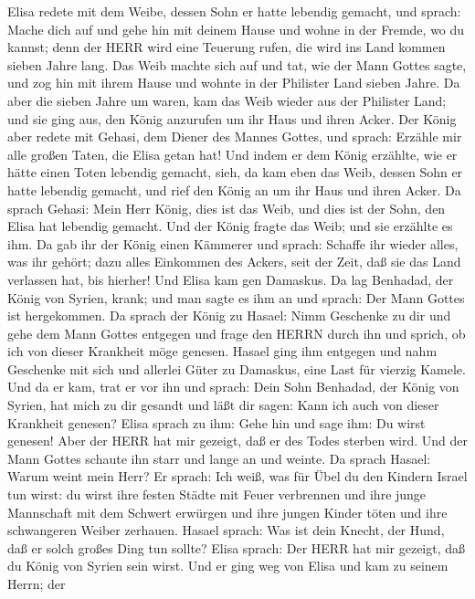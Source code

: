  Elisa redete mit dem Weibe, dessen Sohn er hatte lebendig
gemacht, und sprach: Mache dich auf und gehe hin mit deinem Hause und
wohne in der Fremde, wo du kannst; denn der HERR wird eine Teuerung
rufen, die wird ins Land kommen sieben Jahre lang.  Das Weib
machte sich auf und tat, wie der Mann Gottes sagte, und zog hin mit
ihrem Hause und wohnte in der Philister Land sieben Jahre. 
Da aber die sieben Jahre um waren, kam das Weib wieder aus der Philister
Land; und sie ging aus, den König anzurufen um ihr Haus und ihren Acker.
 Der König aber redete mit Gehasi, dem Diener des Mannes
Gottes, und sprach: Erzähle mir alle großen Taten, die Elisa getan hat!
 Und indem er dem König erzählte, wie er hätte einen Toten
lebendig gemacht, sieh, da kam eben das Weib, dessen Sohn er hatte
lebendig gemacht, und rief den König an um ihr Haus und ihren Acker. Da
sprach Gehasi: Mein Herr König, dies ist das Weib, und dies ist der
Sohn, den Elisa hat lebendig gemacht.  Und der König fragte
das Weib; und sie erzählte es ihm. Da gab ihr der König einen Kämmerer
und sprach: Schaffe ihr wieder alles, was ihr gehört; dazu alles
Einkommen des Ackers, seit der Zeit, daß sie das Land verlassen hat, bis
hierher!  Und Elisa kam gen Damaskus. Da lag Benhadad, der
König von Syrien, krank; und man sagte es ihm an und sprach: Der Mann
Gottes ist hergekommen.  Da sprach der König zu Hasael: Nimm
Geschenke zu dir und gehe dem Mann Gottes entgegen und frage den HERRN
durch ihn und sprich, ob ich von dieser Krankheit möge genesen.
 Hasael ging ihm entgegen und nahm Geschenke mit sich und
allerlei Güter zu Damaskus, eine Last für vierzig Kamele. Und da er kam,
trat er vor ihn und sprach: Dein Sohn Benhadad, der König von Syrien,
hat mich zu dir gesandt und läßt dir sagen: Kann ich auch von dieser
Krankheit genesen?  Elisa sprach zu ihm: Gehe hin und sage
ihm: Du wirst genesen! Aber der HERR hat mir gezeigt, daß er des Todes
sterben wird.  Und der Mann Gottes schaute ihn starr und
lange an und weinte.  Da sprach Hasael: Warum weint mein
Herr? Er sprach: Ich weiß, was für Übel du den Kindern Israel tun wirst:
du wirst ihre festen Städte mit Feuer verbrennen und ihre junge
Mannschaft mit dem Schwert erwürgen und ihre jungen Kinder töten und
ihre schwangeren Weiber zerhauen.  Hasael sprach: Was ist
dein Knecht, der Hund, daß er solch großes Ding tun sollte? Elisa
sprach: Der HERR hat mir gezeigt, daß du König von Syrien sein wirst.
 Und er ging weg von Elisa und kam zu seinem Herrn; der
